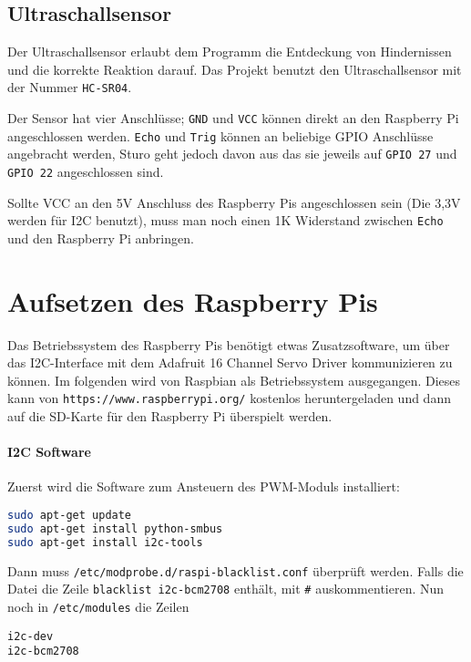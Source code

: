 \documentclass[a4paper,10pt]{scrartcl}
\begin{document}
  \subsection{Ultraschallsensor}

    Der Ultraschallsensor erlaubt dem Programm die Entdeckung von Hindernissen
    und die korrekte Reaktion darauf.
    Das Projekt benutzt den Ultraschallsensor mit der Nummer
    \lstinline{HC-SR04}.

    Der Sensor hat vier Anschlüsse;
    \lstinline{GND} und \lstinline{VCC} können direkt an den Raspberry Pi
    angeschlossen werden.
    \lstinline{Echo} und \lstinline{Trig} können an beliebige GPIO Anschlüsse
    angebracht werden, Sturo geht jedoch davon aus das sie jeweils auf
    \lstinline{GPIO 27} und \lstinline{GPIO 22} angeschlossen sind.

    Sollte VCC an den 5V Anschluss des Raspberry Pis angeschlossen sein
    (Die 3,3V werden für I2C benutzt), muss man noch einen 1K Widerstand
    zwischen \lstinline{Echo} und den Raspberry Pi anbringen.

\section{Aufsetzen des Raspberry Pis}

  Das Betriebssystem des Raspberry Pis benötigt etwas Zusatzsoftware, um über
  das I2C-Interface mit dem Adafruit 16 Channel Servo Driver kommunizieren zu
  können.
  Im folgenden wird von Raspbian als Betriebssystem ausgegangen.
  Dieses kann von \lstinline{https://www.raspberrypi.org/} kostenlos
  heruntergeladen und dann auf die SD-Karte für den Raspberry Pi überspielt
  werden.

  \paragraph{I2C Software} Zuerst wird die Software zum Ansteuern des PWM-Moduls
  installiert:
    \begin{lstlisting}[language=sh]
sudo apt-get update
sudo apt-get install python-smbus
sudo apt-get install i2c-tools
    \end{lstlisting}

    Dann muss \lstinline{/etc/modprobe.d/raspi-blacklist.conf} überprüft werden.
    Falls die Datei die Zeile \lstinline{blacklist i2c-bcm2708} enthält, mit
    \lstinline{#} auskommentieren.
    Nun noch in \lstinline{/etc/modules} die Zeilen
    \begin{lstlisting}
i2c-dev
i2c-bcm2708
    \end{lstlisting}
\end{document}
